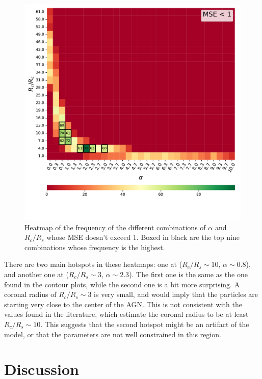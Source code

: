 \begin{figure}[H]
    \includegraphics[width=\textwidth]{Figures/Frequencymse1.pdf}
    \centering
    \caption{Heatmap of the frequency of the different combinations of $\alpha$ and $R_c/R_s$ whose MSE doesn't exceed 1. Boxed in black are the top nine combinations whose frequency is the highest.}
    \label{fig:frequencymse1}
\end{figure}

There are two main hotspots in these heatmaps: one at ($R_c/R_s \sim 10$, $\alpha \sim 0.8$), and another one at ($R_c/R_s \sim 3$, $\alpha \sim 2.3$). The first one is the same as the one found in the contour plots, while the second one is a bit more surprising. A coronal radius of $R_c/R_s \sim 3$ is very small, and would imply that the particles are starting very close to the center of the AGN. This is not consistent with the values found in the literature, which estimate the coronal radius to be at least $R_c/R_s \sim 10$. This suggests that the second hotspot might be an artifact of the model, or that the parameters are not well constrained in this region.

\section{Discussion}
\label{sec:Discussion}

